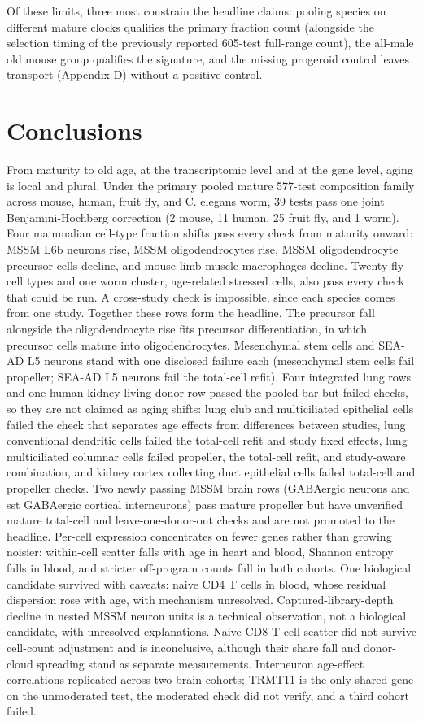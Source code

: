 \documentclass[11pt]{article}
\begin{document}
Of these limits, three most constrain the headline claims: pooling species on different mature clocks qualifies the primary fraction count (alongside the selection timing of the previously reported 605-test full-range count), the all-male old mouse group qualifies the signature, and the missing progeroid control leaves transport (Appendix D) without a positive control.

\section*{Conclusions}

From maturity to old age, at the transcriptomic level and at the gene level, aging is local and plural. Under the primary pooled mature 577-test composition family across mouse, human, fruit fly, and C. elegans worm, 39 tests pass one joint Benjamini-Hochberg correction (2 mouse, 11 human, 25 fruit fly, and 1 worm). Four mammalian cell-type fraction shifts pass every check from maturity onward: MSSM L6b neurons rise, MSSM oligodendrocytes rise, MSSM oligodendrocyte precursor cells decline, and mouse limb muscle macrophages decline. Twenty fly cell types and one worm cluster, age-related stressed cells, also pass every check that could be run. A cross-study check is impossible, since each species comes from one study. Together these rows form the headline. The precursor fall alongside the oligodendrocyte rise fits precursor differentiation, in which precursor cells mature into oligodendrocytes. Mesenchymal stem cells and SEA-AD L5 neurons stand with one disclosed failure each (mesenchymal stem cells fail propeller; SEA-AD L5 neurons fail the total-cell refit). Four integrated lung rows and one human kidney living-donor row passed the pooled bar but failed checks, so they are not claimed as aging shifts: lung club and multiciliated epithelial cells failed the check that separates age effects from differences between studies, lung conventional dendritic cells failed the total-cell refit and study fixed effects, lung multiciliated columnar cells failed propeller, the total-cell refit, and study-aware combination, and kidney cortex collecting duct epithelial cells failed total-cell and propeller checks. Two newly passing MSSM brain rows (GABAergic neurons and sst GABAergic cortical interneurons) pass mature propeller but have unverified mature total-cell and leave-one-donor-out checks and are not promoted to the headline. Per-cell expression concentrates on fewer genes rather than growing noisier: within-cell scatter falls with age in heart and blood, Shannon entropy falls in blood, and stricter off-program counts fall in both cohorts. One biological candidate survived with caveats: naive CD4 T cells in blood, whose residual dispersion rose with age, with mechanism unresolved. Captured-library-depth decline in nested MSSM neuron units is a technical observation, not a biological candidate, with unresolved explanations. Naive CD8 T-cell scatter did not survive cell-count adjustment and is inconclusive, although their share fall and donor-cloud spreading stand as separate measurements. Interneuron age-effect correlations replicated across two brain cohorts; TRMT11 is the only shared gene on the unmoderated test, the moderated check did not verify, and a third cohort failed.
\end{document}
